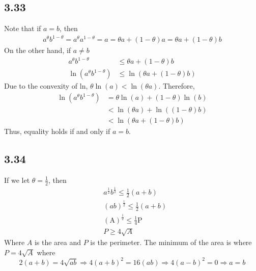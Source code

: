 \documentclass[letterpaper,12pt]{article}
\theoremstyle{definition}
\begin{document}
\subsection*{3.33}
Note that if $a=b$, then
\begin{align*}
    a^\theta b^{1-\theta} =a^\theta a^{1-\theta} = a = \theta a + (1-\theta)a = \theta a + (1-\theta)b
\end{align*}
On the other hand, if $a \neq b$
\begin{align*}
a^\theta b^{1-\theta} &\leq \theta a + (1-\theta)b\\
\ln(a^\theta b^{1-\theta}) &\leq \ln(\theta a + (1-\theta)b)
\end{align*}
Due to the convexity of ln, $\theta \ln(a) < \ln(\theta a)$. Therefore,
\begin{align*}
    \ln(a^\theta b^{1-\theta}) &= \theta \ln(a) + (1-\theta)\ln(b)\\
    & < \ln(\theta a ) + \ln( (1-\theta) b) \\
    & < \ln( \theta a + (1- \theta)b) 
\end{align*}
Thus, equality holds if and only if $a = b$.

\subsection*{3.34}
If we let $\theta=\frac{1}{2}$, then 
\begin{align*}
&a^\frac{1}{2}b^\frac{1}{2} \leq \frac{1}{2} (a+b) \\
&(ab)^\frac{1}{2} \leq \frac{1}{2} (a+b) \\
&(\text{A})^\frac{1}{2} \leq \frac{1}{4} \text{P} \\
& P \geq 4 \sqrt{A}
\end{align*}
Where $A$ is the area and $P$ is the perimeter.
The minimum of the area is where $P=4 \sqrt{A}$ where
\[2(a+b)=4\sqrt{ab} \Rightarrow 4(a+b)^2 = 16(ab) \Rightarrow 4(a-b)^2=0 \Rightarrow a=b \]
\end{document}
